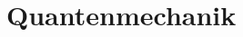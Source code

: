 \renewcommand{\lastmod}{12. September 2025}
\renewcommand{\chapterauthors}{Markus Lippitz}

\chapter{Quantenmechanik}








